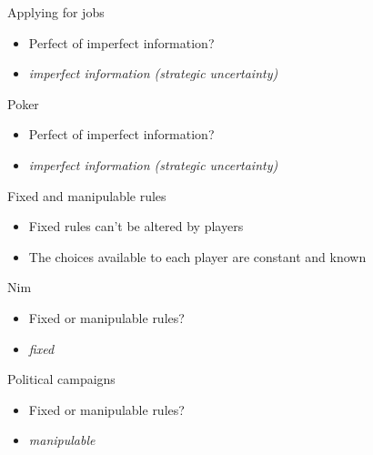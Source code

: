 \documentclass[10pt]{beamer}
\begin{document}
\begin{frame}[label={sec:org6ccca2b}]{}
\alert{Applying for jobs}
\begin{itemize}
\item Perfect of imperfect information?
\end{itemize}
\begin{itemize}
\item \emph{imperfect information (strategic uncertainty)}
\end{itemize}
\end{frame}

\begin{frame}[label={sec:org26f67ae}]{}
\alert{Poker}
\begin{itemize}
\item Perfect of imperfect information?
\end{itemize}
\begin{itemize}
\item \emph{imperfect information (strategic uncertainty)}
\end{itemize}
\end{frame}

\begin{frame}[label={sec:orgec936ec}]{}
\alert{Fixed and manipulable rules}
\begin{itemize}
\item Fixed rules can't be altered by players
\item The choices available to each player are constant and known
\end{itemize}
\end{frame}

\begin{frame}[label={sec:org17da2a0}]{}
\alert{Nim}
\begin{itemize}
\item Fixed or manipulable rules?
\end{itemize}
\begin{itemize}
\item \emph{fixed}
\end{itemize}
\end{frame}

\begin{frame}[label={sec:orgee935f3}]{}
\alert{Political campaigns}
\begin{itemize}
\item Fixed or manipulable rules?
\end{itemize}
\begin{itemize}
\item \emph{manipulable}
\end{itemize}
\end{frame}
\end{document}
